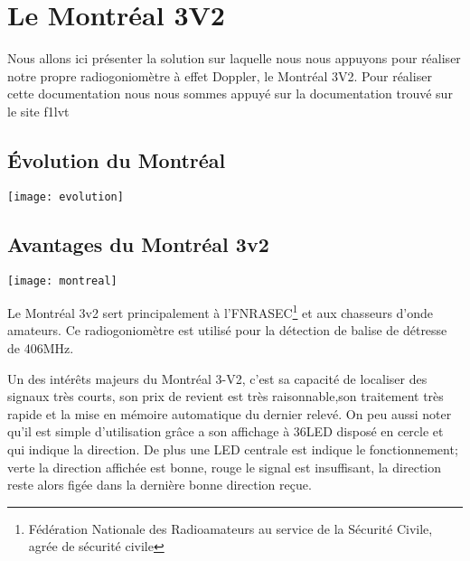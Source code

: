 \chapter{Le Montréal 3V2}
\label{montreal}

Nous allons ici présenter la solution sur laquelle nous nous appuyons pour réaliser notre propre radiogoniomètre à effet Doppler, le Montréal 3V2.
Pour réaliser cette documentation nous nous sommes appuyé sur la documentation trouvé sur le site f1lvt \cite{montreal}

\section{Évolution du Montréal}

\texttt{[image: evolution]}

\section{Avantages du Montréal 3v2}

\begin{center}
  \texttt{[image: montreal]}
\end{center}

\parindent=15pt
Le Montréal 3v2 sert principalement à l'FNRASEC\footnote{Fédération Nationale des Radioamateurs au service de la Sécurité Civile, agrée de sécurité civile} et aux chasseurs d'onde amateurs. Ce radiogoniomètre est utilisé pour la détection de balise de détresse de 406MHz.


Un des intérêts majeurs du Montréal 3-V2, c'est sa capacité de localiser des signaux très courts, son prix de revient est très raisonnable,son traitement très rapide et la mise en mémoire automatique du dernier relevé. On peu aussi noter qu'il est simple d'utilisation grâce a son affichage à 36LED disposé en cercle et qui indique la direction. De plus une LED centrale est indique le fonctionnement; verte la direction affichée est bonne, rouge le signal est insuffisant, la direction reste alors figée dans la dernière bonne direction reçue.


